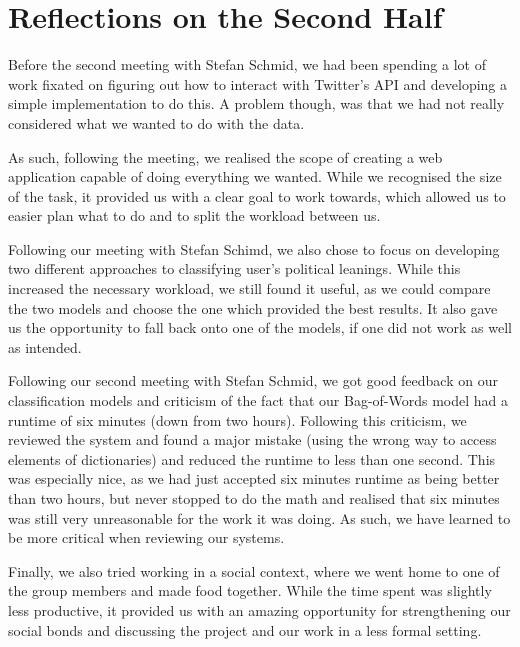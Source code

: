 \section{Reflections on the Second Half}\label{sec:SecRef}
Before the second meeting with Stefan Schmid, we had been spending a lot of work
fixated on figuring out how to interact with Twitter's API and developing a
simple implementation to do this. A problem though, was that we
had not really considered what we wanted to do with the data.\nl

As such, following the meeting, we realised the scope of creating a
web application capable of doing everything we wanted. While we recognised the
size of the task, it provided us with a clear goal to work towards, which
allowed us to easier plan what to do and to split the workload between us.\nl

Following our meeting with Stefan Schimd, we also chose to focus on developing
two different approaches to classifying user's political leanings. While this
increased the necessary workload, we still found it useful, as we could compare
the two models and choose the one which provided the best results. It also gave
us the opportunity to fall back onto one of the models, if one did not work as
well as intended.\nl

Following our second meeting with Stefan Schmid, we got good feedback
on our classification models and criticism of the fact that our Bag-of-Words
model had a runtime of six minutes (down from two hours). Following this
criticism, we reviewed the system and found a major mistake (using the wrong way to access
elements of dictionaries) and reduced the runtime to less than one second. This
was especially nice, as we had just accepted six minutes runtime as being better
than two hours, but never stopped to do the math and realised that six minutes
was still very unreasonable for the work it was doing. As such, we have learned to
be more critical when reviewing our systems.\nl

Finally, we also tried working in a social context, where we went home
to one of the group members and made food together. While the time spent was
slightly less productive, it provided us with an amazing opportunity for
strengthening our social bonds and discussing the project and our work in a
less formal setting.